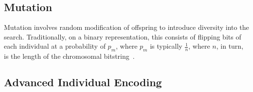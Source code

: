 \documentclass[paper=a4,%
  twoside,%
  BCOR4mm,%
  abstract=true,%
  toc=bibliography,%
  chapterprefix=true,%
  toc=bibliographynumbered,%
  open=right,%
  english,%
  pagesize=pdftex]{scrreprt}
\begin{document}
\subsection{Mutation}
Mutation involves random modification of offspring to introduce diversity into the search. Traditionally, on a binary representation, this consists of flipping bits of each individual at a probability of $p_m$, where $p_m$ is typically $\frac{1}{n}$, where $n$, in turn, is the length of the chromosomal bitstring~\cite{Harman2010a}. 

\subsection{Advanced Individual Encoding}
\end{document}
